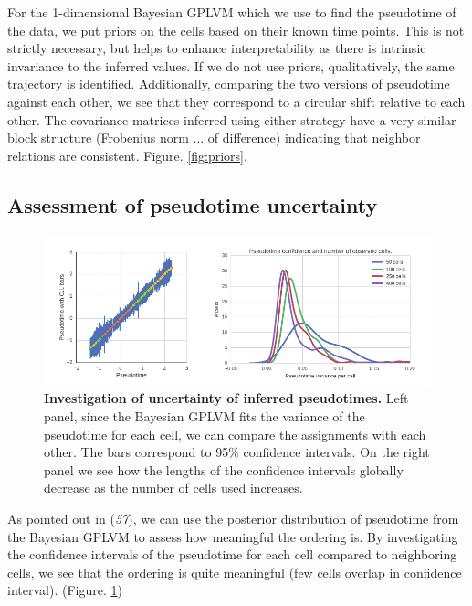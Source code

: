 For the 1-dimensional Bayesian GPLVM which we use to find the pseudotime of the data, we put priors on the cells based on their known time points. This is not strictly necessary, but helps to enhance interpretability as there is intrinsic invariance to the inferred values. If we do not use priors, qualitatively, the same trajectory is identified. Additionally, comparing the two versions of pseudotime against each other, we see that they correspond to a circular shift relative to each other. The covariance matrices inferred using either strategy have a very similar block structure (Frobenius norm ... of difference) indicating that 
neighbor relations are consistent. Figure. \ref{fig:priors}.

\subsection{Assessment of pseudotime uncertainty}

\begin{figure}
    \centering
    \includegraphics[width=\textwidth]{"pseudotime-uncertainty"}
    \caption[Investigation of uncertainty of inferred pseudotimes]{\textbf{Investigation of uncertainty of inferred pseudotimes.} Left panel, since the Bayesian GPLVM fits the variance of the pseudotime for each cell, we can compare the assignments with each other. The bars correspond to 95\% confidence intervals. On the right panel we see how the lengths of the confidence intervals globally decrease as the number of cells used increases.}
    \label{fig:pseudotime-certainty}
\end{figure}

As pointed out in ({\it 57}), we can use the posterior distribution of pseudotime from the Bayesian GPLVM to assess how meaningful the ordering is. By investigating the confidence intervals of the pseudotime for each cell compared to neighboring cells, we see that the ordering is quite meaningful (few cells overlap in confidence interval). (Figure. \ref{fig:pseudotime-certainty})

